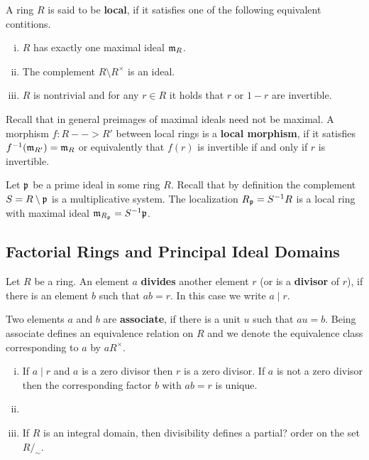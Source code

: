 	\begin{definition}
		A ring $R$ is said to be \textbf{local}, if it satisfies one of the following equivalent contitions.
		\begin{enumerate}[(i)]
			\item{
				$R$ has exactly one maximal ideal $\mathfrak{m}_R$.
			}
			\item{
				The complement $R \setminus R^\times$ is an ideal.
			}
			\item{
				$R$ is nontrivial and for any $r \in R$ it holds that $r$ or $1-r$ are invertible.
			}
		\end{enumerate}

		Recall that in general preimages of maximal ideals need not be maximal. A morphism $f:R-->R'$ between local rings is a \textbf{local morphism}, if it satisfies $f^{-1}(\mathfrak{m}_{R'}) = \mathfrak{m}_R$ or equivalently that $f(r)$ is invertible if and only if $r$ is invertible.
	\end{definition}

	\begin{corollary}
		Let $\mathfrak{p}$ be a prime ideal in some ring $R$. Recall that by definition the complement $S = R\setminus \mathfrak{p}$ is a multiplicative system. The localization $R_{\mathfrak{p}} = S^{-1}R$ is a local ring with maximal ideal $\mathfrak{m}_{R_{\mathfrak{p}}} = S^{-1}\mathfrak{p}$.
	\end{corollary}

	\subsection{Factorial Rings and Principal Ideal Domains}

	\begin{definition}
		Let $R$ be a ring. An element $a$ \textbf{divides} another element $r$ (or is a \textbf{divisor} of $r$), if there is an element $b$ such that $ab = r$. In this case we write $a \mid r$.

		Two elements $a$ and $b$ are \textbf{associate}, if there is a unit $u$ such that $au = b$. Being associate defines an equivalence relation on $R$ and we denote the equivalence class corresponding to $a$ by $aR^\times$. 
	\end{definition}

	\begin{lemma}
		\begin{enumerate}[(i)]
			\item{
				If $a \mid r$ and $a$ is a zero divisor then $r$ is a zero divisor. If $a$ is not a zero divisor then the corresponding factor $b$ with $ab = r$ is unique.
			}
			\item{
			}
			\item{
				If $R$ is an integral domain, then divisibility defines a partial? order on the set $R/_\sim$.
			}
		\end{enumerate}
	\end{lemma}

